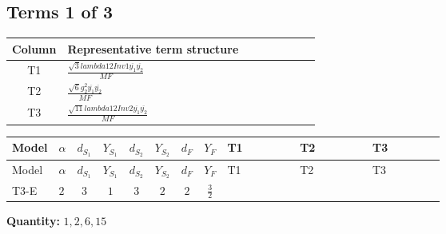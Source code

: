 \documentclass[8pt]{article}
\begin{document}
\begin{landscape}
\subsection*{Terms 1 of 3}
\begin{center}
\begin{tabular}{@{}c >{\raggedright\arraybackslash}p{0.82\linewidth}@{}}
\toprule
Column & Representative term structure \\
\midrule
T1 & \(\displaystyle \frac{\sqrt{3} lambda12Inv1 \overline{y_{1}} \overline{y_{2}}}{MF}\) \\
\midrule
T2 & \(\displaystyle \frac{\sqrt{6} g_{2}^{2} \overline{y_{1}} \overline{y_{2}}}{MF}\) \\
\midrule
T3 & \(\displaystyle \frac{\sqrt{11} lambda12Inv2 \overline{y_{1}} \overline{y_{2}}}{MF}\) \\
\midrule
\bottomrule
\end{tabular}
\end{center}
\smallskip
\tiny
\begin{longtable}{@{}llcccccc >{\raggedright\arraybackslash}p{0.21\linewidth} >{\raggedright\arraybackslash}p{0.21\linewidth} >{\raggedright\arraybackslash}p{0.21\linewidth}@{}}
\toprule
Model & $\alpha$ & $d_{S_1}$ & $Y_{S_1}$ & $d_{S_2}$ & $Y_{S_2}$ & $d_F$ & $Y_F$ & T1 & T2 & T3 \\
\midrule
\endfirsthead
\toprule
Model & $\alpha$ & $d_{S_1}$ & $Y_{S_1}$ & $d_{S_2}$ & $Y_{S_2}$ & $d_F$ & $Y_F$ & T1 & T2 & T3 \\
\midrule
\endhead
T3-E & $2$ & $3$ & $1$ & $3$ & $2$ & $2$ & $\frac{3}{2}$ & \scriptsize\adjustbox{max width=\linewidth}{$\begin{gathered} - \frac{\sqrt{3} lambda12Inv1 \overline{y_{1}} \overline{y_{2}}}{6 MF}\end{gathered}$} & \scriptsize\adjustbox{max width=\linewidth}{$\begin{gathered} \frac{\sqrt{6} g_{2}^{2} \overline{y_{1}} \overline{y_{2}}}{6 MF}\end{gathered}$} & \scriptsize\adjustbox{max width=\linewidth}{$\begin{gathered} \frac{3 \sqrt{11} lambda12Inv2 \overline{y_{1}} \overline{y_{2}}}{22 MF}\end{gathered}$} \\
\midrule
\bottomrule
\end{longtable}
\clearpage
\noindent\textbf{Quantity: }$\mathrm{1,2,6,15}$\par\smallskip

\end{landscape}
\end{document}
